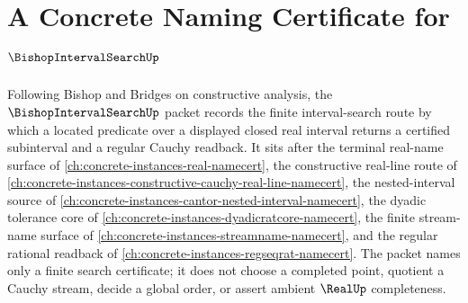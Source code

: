 \chapter{A Concrete Naming Certificate for $\BishopIntervalSearchUp$}
\label{ch:concrete-instances-bishop-interval-search-namecert}

Following Bishop and Bridges on constructive analysis, the $\BishopIntervalSearchUp$ packet records the finite interval-search route by which a located predicate over a displayed closed real interval returns a certified subinterval and a regular Cauchy readback. It sits after the terminal real-name surface of \autoref{ch:concrete-instances-real-namecert}, the constructive real-line route of \autoref{ch:concrete-instances-constructive-cauchy-real-line-namecert}, the nested-interval source of \autoref{ch:concrete-instances-cantor-nested-interval-namecert}, the dyadic tolerance core of \autoref{ch:concrete-instances-dyadicratcore-namecert}, the finite stream-name surface of \autoref{ch:concrete-instances-streamname-namecert}, and the regular rational readback of \autoref{ch:concrete-instances-regseqrat-namecert}. The packet names only a finite search certificate; it does not choose a completed point, quotient a Cauchy stream, decide a global order, or assert ambient $\RealUp$ completeness.

